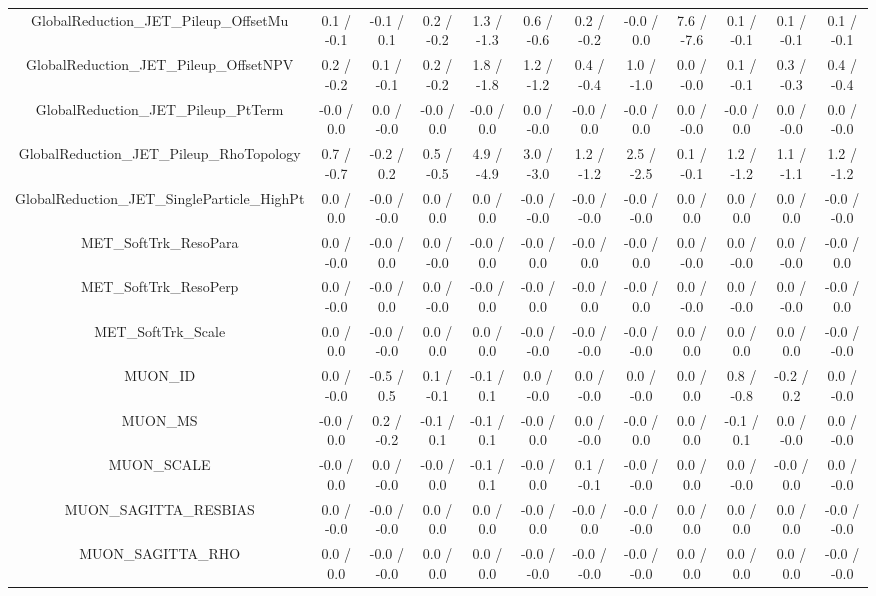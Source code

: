\begin{table}[htbp]
\begin{center}
\begin{tabular}{|c|c|c|c|c|c|c|c|c|c|c|c|}
  GlobalReduction_JET_Pileup_OffsetMu & 0.1 / -0.1 & -0.1 / 0.1 & 0.2 / -0.2 & 1.3 / -1.3 & 0.6 / -0.6 & 0.2 / -0.2 & -0.0 / 0.0 & 7.6 / -7.6 & 0.1 / -0.1 & 0.1 / -0.1 & 0.1 / -0.1 \\ 
  GlobalReduction_JET_Pileup_OffsetNPV & 0.2 / -0.2 & 0.1 / -0.1 & 0.2 / -0.2 & 1.8 / -1.8 & 1.2 / -1.2 & 0.4 / -0.4 & 1.0 / -1.0 & 0.0 / -0.0 & 0.1 / -0.1 & 0.3 / -0.3 & 0.4 / -0.4 \\ 
  GlobalReduction_JET_Pileup_PtTerm & -0.0 / 0.0 & 0.0 / -0.0 & -0.0 / 0.0 & -0.0 / 0.0 & 0.0 / -0.0 & -0.0 / 0.0 & -0.0 / 0.0 & 0.0 / -0.0 & -0.0 / 0.0 & 0.0 / -0.0 & 0.0 / -0.0 \\ 
  GlobalReduction_JET_Pileup_RhoTopology & 0.7 / -0.7 & -0.2 / 0.2 & 0.5 / -0.5 & 4.9 / -4.9 & 3.0 / -3.0 & 1.2 / -1.2 & 2.5 / -2.5 & 0.1 / -0.1 & 1.2 / -1.2 & 1.1 / -1.1 & 1.2 / -1.2 \\ 
  GlobalReduction_JET_SingleParticle_HighPt & 0.0 / 0.0 & -0.0 / -0.0 & 0.0 / 0.0 & 0.0 / 0.0 & -0.0 / -0.0 & -0.0 / -0.0 & -0.0 / -0.0 & 0.0 / 0.0 & 0.0 / 0.0 & 0.0 / 0.0 & -0.0 / -0.0 \\ 
  MET_SoftTrk_ResoPara & 0.0 / -0.0 & -0.0 / 0.0 & 0.0 / -0.0 & -0.0 / 0.0 & -0.0 / 0.0 & -0.0 / 0.0 & -0.0 / 0.0 & 0.0 / -0.0 & 0.0 / -0.0 & 0.0 / -0.0 & -0.0 / 0.0 \\ 
  MET_SoftTrk_ResoPerp & 0.0 / -0.0 & -0.0 / 0.0 & 0.0 / -0.0 & -0.0 / 0.0 & -0.0 / 0.0 & -0.0 / 0.0 & -0.0 / 0.0 & 0.0 / -0.0 & 0.0 / -0.0 & 0.0 / -0.0 & -0.0 / 0.0 \\ 
  MET_SoftTrk_Scale & 0.0 / 0.0 & -0.0 / -0.0 & 0.0 / 0.0 & 0.0 / 0.0 & -0.0 / -0.0 & -0.0 / -0.0 & -0.0 / -0.0 & 0.0 / 0.0 & 0.0 / 0.0 & 0.0 / 0.0 & -0.0 / -0.0 \\ 
  MUON_ID & 0.0 / -0.0 & -0.5 / 0.5 & 0.1 / -0.1 & -0.1 / 0.1 & 0.0 / -0.0 & 0.0 / -0.0 & 0.0 / -0.0 & 0.0 / 0.0 & 0.8 / -0.8 & -0.2 / 0.2 & 0.0 / -0.0 \\ 
  MUON_MS & -0.0 / 0.0 & 0.2 / -0.2 & -0.1 / 0.1 & -0.1 / 0.1 & -0.0 / 0.0 & 0.0 / -0.0 & -0.0 / 0.0 & 0.0 / 0.0 & -0.1 / 0.1 & 0.0 / -0.0 & 0.0 / -0.0 \\ 
  MUON_SCALE & -0.0 / 0.0 & 0.0 / -0.0 & -0.0 / 0.0 & -0.1 / 0.1 & -0.0 / 0.0 & 0.1 / -0.1 & -0.0 / -0.0 & 0.0 / 0.0 & 0.0 / -0.0 & -0.0 / 0.0 & 0.0 / -0.0 \\ 
  MUON_SAGITTA_RESBIAS & 0.0 / -0.0 & -0.0 / -0.0 & 0.0 / 0.0 & 0.0 / 0.0 & -0.0 / 0.0 & -0.0 / 0.0 & -0.0 / -0.0 & 0.0 / 0.0 & 0.0 / 0.0 & 0.0 / 0.0 & -0.0 / -0.0 \\ 
  MUON_SAGITTA_RHO & 0.0 / 0.0 & -0.0 / -0.0 & 0.0 / 0.0 & 0.0 / 0.0 & -0.0 / -0.0 & -0.0 / -0.0 & -0.0 / -0.0 & 0.0 / 0.0 & 0.0 / 0.0 & 0.0 / 0.0 & -0.0 / -0.0 \\ 

\end{tabular}
\end{center}
\end{table}

